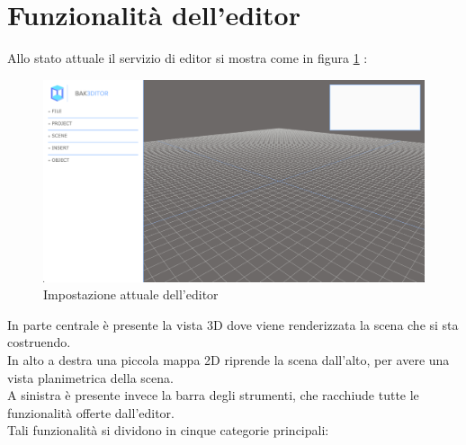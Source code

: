 \section{Funzionalità dell'editor}
\label{sec:chapter_creazione_scena_funzionalita_editor}

Allo stato attuale il servizio di editor si mostra come in figura \ref{fig:editor_1} :
\\
\begin{figure}[htb]
 \centering
 \includegraphics[width=1\linewidth]{images/chapter_creazione_scena/editor_1.png}\hfill
 \caption[Editor: stato attuale]{Impostazione attuale dell'editor}
 \label{fig:editor_1}
\end{figure}
In parte centrale è presente la vista 3D dove viene renderizzata la scena che si sta costruendo.
\\ 
In alto a destra una piccola mappa 2D riprende la scena dall’alto, per avere una vista planimetrica della scena.
\\
A sinistra è presente invece la barra degli strumenti, che racchiude tutte le funzionalità offerte dall’editor.
\\
Tali funzionalità si dividono in cinque categorie principali:
